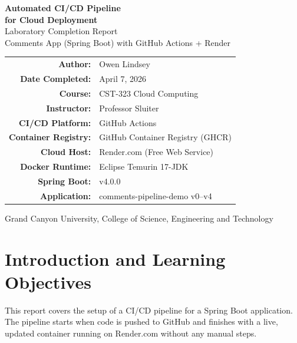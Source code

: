 \documentclass[11pt,letterpaper]{article}
\begin{document}
\begin{titlepage}
\centering
\vspace*{2cm}
{\Huge\bfseries Automated CI/CD Pipeline\\for Cloud Deployment\\[6pt]}
{\LARGE Laboratory Completion Report\\[12pt]}
{\Large Comments App (Spring Boot) with GitHub Actions + Render\\[24pt]}

\begin{tabular}{@{}rl@{}}
\textbf{Author:}            & Owen Lindsey \\
\textbf{Date Completed:}    & April 7, 2026 \\
\textbf{Course:}            & CST-323 Cloud Computing \\
\textbf{Instructor:}        & Professor Sluiter \\
\textbf{CI/CD Platform:}    & GitHub Actions \\
\textbf{Container Registry:}& GitHub Container Registry (GHCR) \\
\textbf{Cloud Host:}        & Render.com (Free Web Service) \\
\textbf{Docker Runtime:}    & Eclipse Temurin 17-JDK \\
\textbf{Spring Boot:}       & v4.0.0 \\
\textbf{Application:}       & comments-pipeline-demo v0--v4 \\
\end{tabular}

\vfill
{\small Grand Canyon University, College of Science, Engineering and Technology}
\end{titlepage}

\tableofcontents
\vspace{12pt}

\section{Introduction and Learning Objectives}

This report covers the setup of a CI/CD pipeline for a Spring Boot application. The pipeline starts when code is pushed to GitHub and finishes with a live, updated container running on Render.com without any manual steps.
\end{document}
